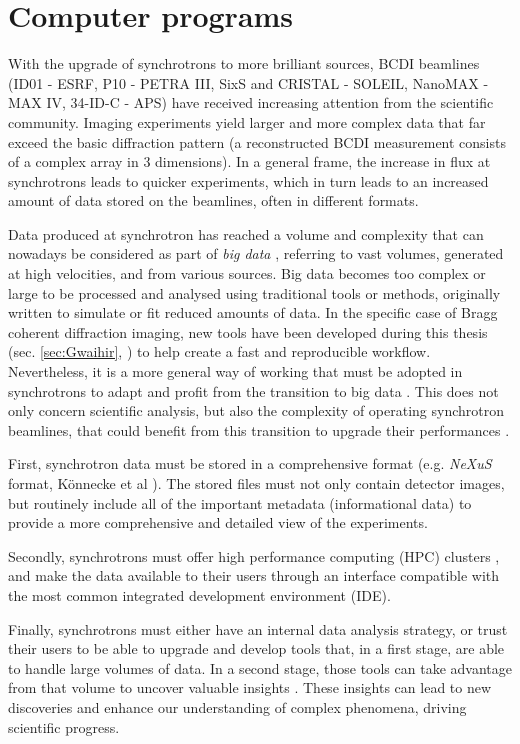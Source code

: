 \section{Computer programs}

With the upgrade of synchrotrons to more brilliant sources, BCDI beamlines (ID01 - ESRF, P10 - PETRA III, SixS and CRISTAL - SOLEIL, NanoMAX - MAX IV, 34-ID-C - APS) have received increasing attention from the scientific community.
Imaging experiments yield larger and more complex data that far exceed the basic diffraction pattern (a reconstructed BCDI measurement consists of a complex array in 3 dimensions).
In a general frame, the increase in flux at synchrotrons leads to quicker experiments, which in turn leads to an increased amount of data stored on the beamlines, often in different formats.

Data produced at synchrotron has reached a volume and complexity that can nowadays be considered as part of \textit{big data} \parencite{Alizada2017, Wang2018}, referring to vast volumes, generated at high velocities, and from various sources.
Big data becomes too complex or large to be processed and analysed using traditional tools or methods, originally written to simulate or fit reduced amounts of data.
In the specific case of Bragg coherent diffraction imaging, new tools have been developed during this thesis (sec. \ref{sec:Gwaihir}, \cite{Carnis2021c, Simonne2022}) to help create a fast and reproducible workflow.
Nevertheless, it is a more general way of working that must be adopted in synchrotrons to adapt and profit from the transition to big data \parencite{Wang2018}.
This does not only concern scientific analysis, but also the complexity of operating synchrotron beamlines, that could benefit from this transition to upgrade their performances \parencite{Diadem}.

First, synchrotron data must be stored in a comprehensive format (e.g. \textit{NeXuS} format, Könnecke et al \cite*{Konnecke2015}).
The stored files must not only contain detector images, but routinely include all of the important metadata (informational data) to provide a more comprehensive and detailed view of the experiments.

Secondly, synchrotrons must offer high performance computing (HPC) clusters \parencite{Wang2021}, and make the data available to their users through an interface compatible with the most common integrated development environment (IDE).

Finally, synchrotrons must either have an internal data analysis strategy, or trust their users to be able to upgrade and develop tools that, in a first stage, are able to handle large volumes of data.
In a second stage, those tools can take advantage from that volume to uncover valuable insights \parencite{Wang2016a, Khaleghi2019}.
These insights can lead to new discoveries and enhance our understanding of complex phenomena, driving scientific progress.

